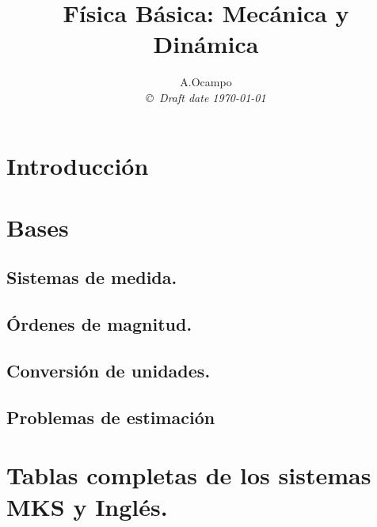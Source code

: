 \documentclass[10pt]{book}
\theoremstyle{definition}
\begin{document}
\title{F\'isica B\'asica: Mec\'anica y Din\'amica }
\author{A.Ocampo  \\
{\small\em \copyright \  Draft date \today }}
\date{ }
\maketitle
{}
\tableofcontents
\listoffigures
\listoftables
\Large
\chapter{Introducci\'on}

\chapter{Bases}

\section{Sistemas de medida.}

\section{\'Ordenes de magnitud.}

\section{Conversi\'on de unidades.}

\section{Problemas de estimaci\'on}

\appendix
\chapter{Tablas completas de los sistemas MKS y Ingl\'es.}



\end{document}
